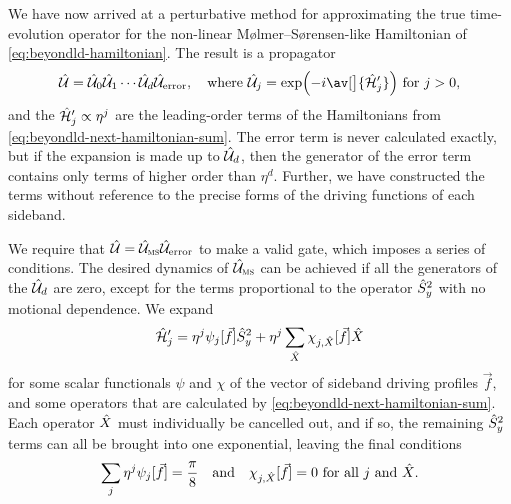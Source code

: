 We have now arrived at a perturbative method for approximating the true time-evolution operator for the non-linear M\o lmer--S\o rensen-like Hamiltonian of \cref{eq:beyondld-hamiltonian}.
The result is a propagator
\begin{equation}
\U = \U_0\U_1\dotsm\U_d\U_{\text{error}}, \quad\text{where $\U_j = \exp\Bigl(-i\av[\big]{\H_j'}\Bigr)$ for $j>0$},
\end{equation}
and the $\hat{\mathcal H}_j' \propto \eta^j$ are the leading-order terms of the Hamiltonians from \cref{eq:beyondld-next-hamiltonian-sum}.
The error term is never calculated exactly, but if the expansion is made up to $\hat{\mathcal U}_d$, then the generator of the error term contains only terms of higher order than $\eta^d$.
Further, we have constructed the terms without reference to the precise forms of the driving functions of each sideband.

We require that $\hat{\mathcal U} = \hat{\mathcal U}_{\textsc{ms}}\hat{\mathcal U}_{\text{error}}$ to make a valid gate, which imposes a series of conditions.
The desired dynamics of $\hat{\mathcal U}_{\textsc{ms}}$ can be achieved if all the generators of the $\hat{\mathcal U}_d$ are zero, except for the terms proportional to the operator $\hat{S}_y^2$ with no motional dependence.
We expand
\begin{equation}
\hat{\mathcal H}_j' = \eta^j\psi_j[\vec f]\hat{S}_y^2 + \eta^j \sum_{\hat{X}}\chi_{j,\hat{X}}[\vec f]\hat{X}
\end{equation}
for some scalar functionals $\psi$ and $\chi$ of the vector of sideband driving profiles $\vec f$, and some operators that are calculated by \cref{eq:beyondld-next-hamiltonian-sum}.
Each operator $\hat{X}$ must individually be cancelled out, and if so, the remaining $\hat{S}_y^2$ terms can all be brought into one exponential, leaving the final conditions
\begin{equation}\label{eq:beyondld-conditions}
\sum_j \eta^j\psi_j[\vec f] = \frac\pi8\quad\text{and}\quad\chi_{j,\hat{X}}[\vec f] = 0\ \text{for all $j$ and $\hat{X}$}.
\end{equation}


